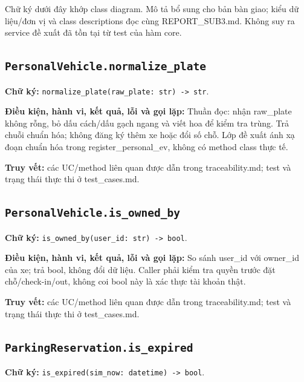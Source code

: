 \documentclass[11pt,a4paper]{article}
\begin{document}
Chữ ký dưới đây khớp class diagram. Mô tả bổ sung cho bản bàn giao; kiểu
dữ liệu/đơn vị và class descriptions đọc cùng REPORT\_SUB3.md. Không suy
ra service đề xuất đã tồn tại từ test của hàm core.

\hypertarget{personalvehicle.normalize_plate}{%
\subsection{\texorpdfstring{\texttt{PersonalVehicle.normalize\_plate}}{PersonalVehicle.normalize\_plate}}\label{personalvehicle.normalize_plate}}

\textbf{Chữ ký:}
\texttt{normalize\_plate(raw\_plate:\ str)\ -\textgreater{}\ str}.

\textbf{Điều kiện, hành vi, kết quả, lỗi và gọi lặp:} Thuần đọc: nhận
raw\_plate không rỗng, bỏ dấu cách/dấu gạch ngang và viết hoa để kiểm
tra trùng. Trả chuỗi chuẩn hóa; không đăng ký thêm xe hoặc đổi số chỗ.
Lớp đề xuất ánh xạ đoạn chuẩn hóa trong register\_personal\_ev, không có
method class thực tế.

\textbf{Truy vết:} các UC/method liên quan được dẫn trong
traceability.md; test và trạng thái thực thi ở test\_cases.md.

\hypertarget{personalvehicle.is_owned_by}{%
\subsection{\texorpdfstring{\texttt{PersonalVehicle.is\_owned\_by}}{PersonalVehicle.is\_owned\_by}}\label{personalvehicle.is_owned_by}}

\textbf{Chữ ký:}
\texttt{is\_owned\_by(user\_id:\ str)\ -\textgreater{}\ bool}.

\textbf{Điều kiện, hành vi, kết quả, lỗi và gọi lặp:} So sánh user\_id
với owner\_id của xe; trả bool, không đổi dữ liệu. Caller phải kiểm tra
quyền trước đặt chỗ/check-in/out, không coi bool này là xác thực tài
khoản thật.

\textbf{Truy vết:} các UC/method liên quan được dẫn trong
traceability.md; test và trạng thái thực thi ở test\_cases.md.

\hypertarget{parkingreservation.is_expired}{%
\subsection{\texorpdfstring{\texttt{ParkingReservation.is\_expired}}{ParkingReservation.is\_expired}}\label{parkingreservation.is_expired}}

\textbf{Chữ ký:}
\texttt{is\_expired(sim\_now:\ datetime)\ -\textgreater{}\ bool}.
\end{document}
